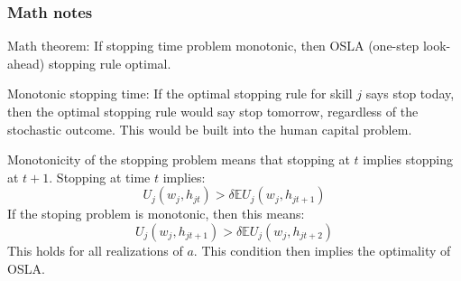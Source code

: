 \documentclass[10 pt]{article}
\newcommand{\mathnotes}[1]{#1}
\newcommand{\mathnotes}[1]{}
\begin{document}
\mathnotes{
\subsubsection*{Math notes}

Math theorem: If stopping time problem monotonic, then OSLA (one-step look-ahead) stopping rule optimal. 
\begin{blist}

\item Monotonic stopping time: If the optimal stopping rule for skill $j$ says stop today, then the optimal stopping rule would say stop tomorrow, regardless of the stochastic outcome. This would be built into the human capital problem. 

\item Monotonicity of the stopping problem means that stopping at $t$ implies stopping at $t+1$. Stopping at time $t$ implies: \nts{(I think)}
\begin{equation*}
 U_j(w_j, h_{jt}) > \delta \mathbb{E} U_j(w_j, h_{jt+1})
\end{equation*}
If the stoping problem is monotonic, then this means: 
\begin{equation*}
 U_j(w_j, h_{jt+1}) > \delta \mathbb{E} U_j(w_j, h_{jt+2})
\end{equation*}
This holds for all realizations of $a$. 
This condition then implies the optimality of OSLA.


\end{blist}}
\end{document}
